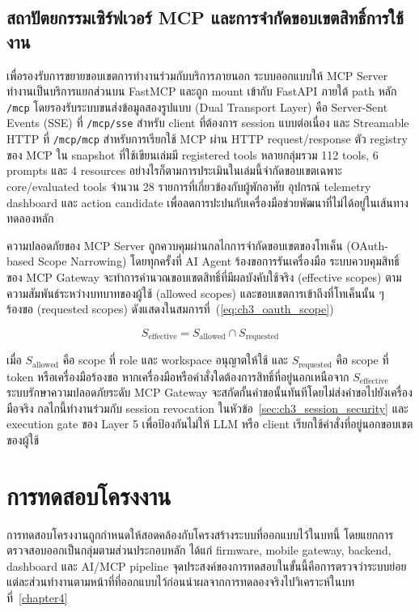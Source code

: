 \subsection*{\thesubsection\quad สถาปัตยกรรมเซิร์ฟเวอร์ MCP และการจำกัดขอบเขตสิทธิ์การใช้งาน}
เพื่อรองรับการขยายขอบเขตการทำงานร่วมกับบริการภายนอก ระบบออกแบบให้ MCP Server ทำงานเป็นบริการแยกส่วนบน FastMCP และถูก mount เข้ากับ FastAPI ภายใต้ path หลัก \texttt{/mcp} โดยรองรับระบบขนส่งข้อมูลสองรูปแบบ (Dual Transport Layer) คือ Server-Sent Events (SSE) ที่ \texttt{/mcp/sse} สำหรับ client ที่ต้องการ session แบบต่อเนื่อง และ Streamable HTTP ที่ \texttt{/mcp/mcp} สำหรับการเรียกใช้ MCP ผ่าน HTTP request/response ตัว registry ของ MCP ใน snapshot ที่ใช้เขียนเล่มมี registered tools หลายกลุ่มรวม 112 tools, 6 prompts และ 4 resources อย่างไรก็ตามการประเมินในเล่มนี้จำกัดขอบเขตเฉพาะ core/evaluated tools จำนวน 28 รายการที่เกี่ยวข้องกับผู้พักอาศัย อุปกรณ์ telemetry dashboard และ action candidate เพื่อลดการปะปนกับเครื่องมือช่วยพัฒนาที่ไม่ได้อยู่ในเส้นทางทดลองหลัก

ความปลอดภัยของ MCP Server ถูกควบคุมผ่านกลไกการจำกัดขอบเขตของโทเค็น (OAuth-based Scope Narrowing) โดยทุกครั้งที่ AI Agent ร้องขอการรันเครื่องมือ ระบบควบคุมสิทธิ์ของ MCP Gateway จะทำการคำนวณขอบเขตสิทธิ์ที่มีผลบังคับใช้จริง (effective scopes) ตามความสัมพันธ์ระหว่างบทบาทของผู้ใช้ (allowed scopes) และขอบเขตการเข้าถึงที่โทเค็นนั้น ๆ ร้องขอ (requested scopes) ดังแสดงในสมการที่~(\ref{eq:ch3_oauth_scope})

\begin{equation}
S_{\mathrm{effective}} = S_{\mathrm{allowed}} \cap S_{\mathrm{requested}}
\label{eq:ch3_oauth_scope}
\end{equation}

เมื่อ \(S_{\mathrm{allowed}}\) คือ scope ที่ role และ workspace อนุญาตให้ใช้ และ \(S_{\mathrm{requested}}\) คือ scope ที่ token หรือเครื่องมือร้องขอ หากเครื่องมือหรือคำสั่งใดต้องการสิทธิ์ที่อยู่นอกเหนือจาก \(S_{\mathrm{effective}}\) ระบบรักษาความปลอดภัยระดับ MCP Gateway จะสกัดกั้นคำขอนั้นทันทีโดยไม่ส่งคำขอไปยังเครื่องมือจริง กลไกนี้ทำงานร่วมกับ session revocation ในหัวข้อ~\ref{sec:ch3_session_security} และ execution gate ของ Layer 5 เพื่อป้องกันไม่ให้ LLM หรือ client เรียกใช้คำสั่งที่อยู่นอกขอบเขตของผู้ใช้

\section{การทดสอบโครงงาน}
\label{sec:ch3_project_testing}
การทดสอบโครงงานถูกกำหนดให้สอดคล้องกับโครงสร้างระบบที่ออกแบบไว้ในบทนี้ โดยแยกการตรวจสอบออกเป็นกลุ่มตามส่วนประกอบหลัก ได้แก่ firmware, mobile gateway, backend, dashboard และ AI/MCP pipeline จุดประสงค์ของการทดสอบในขั้นนี้คือการตรวจว่าระบบย่อยแต่ละส่วนทำงานตามหน้าที่ที่ออกแบบไว้ก่อนนำผลจากการทดลองจริงไปวิเคราะห์ในบทที่~\ref{chapter4}

